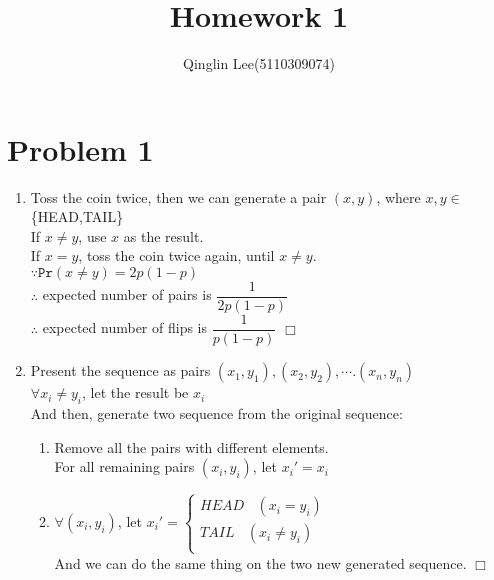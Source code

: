 \documentclass[12pt]{article}
\date{}
\title{Homework 1}
\author{Qinglin Lee(5110309074)}
\def\qed{\hfill\mbox{$\Box$}}
\begin{document}
\maketitle

\section*{Problem 1}
\begin{enumerate}[(1)]
\item
	Toss the coin twice, then we can generate a pair $(x,y)$, where $x,y \in$\{HEAD,TAIL\}\\
	If $x\neq y$, use $x$ as the result.\\
	If $x=y$, toss the coin twice again, until $x\neq y$.\\
	$\because \mathtt{Pr}(x\neq y)=2p(1-p)$\\
	$\therefore$ expected number of pairs is $\dfrac{1}{2p(1-p)}$\\
	$\therefore$ expected number of flips is $\dfrac{1}{p(1-p)}$
	\qed
\item
	Present the sequence as pairs $(x_1,y_1), (x_2,y_2), \cdots. (x_n,y_n)$\\
	$\forall x_i\neq y_i$, let the result be $x_i$\\
	And then, generate two sequence from the original sequence:
	\begin{enumerate}
	\item
	Remove all the pairs with different elements.\\
	For all remaining pairs $(x_i,y_i)$, let $x_i'=x_i$\\ 
	\item
	$\forall(x_i,y_i)$, let
	$	x_i'=
		\left\{
		\begin{array}{rl}
			HEAD~~~~(x_i=y_i)\\
			TAIL~~~~(x_i\neq y_i)\\
		\end{array}
		\right.
	$\\
	And we can do the same thing on the two new generated sequence.
	\qed
	\end{enumerate}
\end{enumerate}
\end{document}
